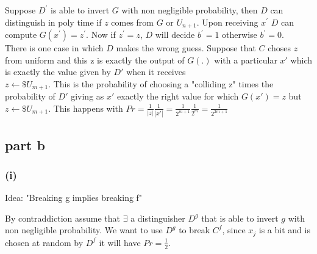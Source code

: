 \documentclass[11pt]{article}
\newcounter{t0d0_counter}
\begin{document}
Suppose $D^\prime$ is able to invert $G$ with non negligible probability, then $D$ can distinguish in poly time if $z$ comes from $G$ or $U_{n+1}$. 
Upon receiving $x^\prime$ $D$ can compute $G(x^\prime)=z^\prime$.
Now if $z^\prime=z$, $D$ will decide $b^\prime=1$ otherwise $b^\prime=0$.\\

There is one case in which $D$ makes the wrong guess. Suppose that $C$ choses $z$ from uniform and this z is exactly the output of $G(.)$ with a particular $x'$ which is exactly the value given by $D'$ when it receives \\$z\leftarrow\$U_{m+1}$. This is the probability of choosing a "colliding z" times the probability of $D'$ giving as $x'$ exactly the right value for which $G(x')=z$ but $z\leftarrow\$U_{m+1}$. This happens with $Pr=\frac{1}{|z|}\frac{1}{|x'|}=\frac{1}{2^{m+1}}\frac{1}{2^m}=\frac{1}{2^{2m+1}}$

\newpage
\subsection{part b}
\subsubsection{(i)}
Idea: "Breaking g implies breaking f"
\begin{figure}[h!]
   \centering
   \sdinit{}
\end{figure}

By contraddiction assume that $\exists$ a distinguisher $D^g$ that is able to invert $g$ with non negligible probability.
We want to use $D^g$ to break $C^f$, since $x_j$ is a bit and is chosen at random by $D^f$ it will have $Pr=\frac{1}{2}$. 
\end{document}
